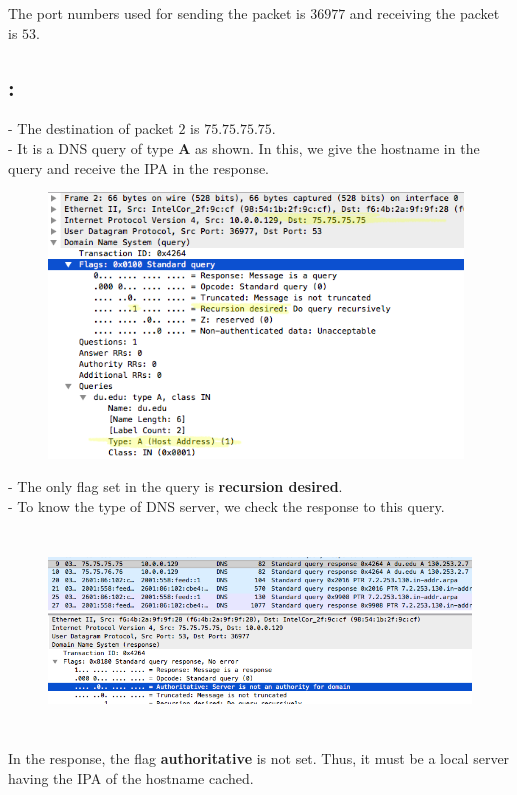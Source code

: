 \documentclass[]{report}
\begin{document}
The port numbers used for sending the packet is $36977$ and receiving the packet is $53$. 

\subsection{:}
- The destination of packet $2$ is $75.75.75.75$. \\
- It is a DNS query of type \textbf{A} as shown. In this, we give the hostname in the query and receive the IPA in the response. 
\\
\begin{figure}[H]
	\vspace{0pt}
	\includegraphics[height = 200pt, keepaspectratio]{Snapshots/q1/1_3_1.png}
\end{figure}
- The only flag set in the query is \textbf{recursion desired}.
\\
- To know the type of DNS server, we check the response to this query. 
\begin{figure}[H]
	\vspace{0pt}
	\includegraphics[height = 150pt, keepaspectratio]{Snapshots/q1/1_3_2.png}
\end{figure}
In the response, the flag \textbf{authoritative} is not set. Thus, it must be a local server having the IPA of the hostname cached. 
\end{document}
